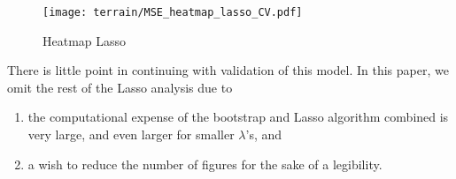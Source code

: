         \begin{figure}
            \texttt{[image: terrain/MSE\_heatmap\_lasso\_CV.pdf]}
            \caption{Heatmap Lasso}
            \label{fig:gc_gridsearch_lasso}
        \end{figure}

        There is little point in continuing with validation of this model. In this paper, we omit the rest of the Lasso analysis due to 

        \begin{enumerate}[label=(\roman*)]
            \item the computational expense of the bootstrap and Lasso algorithm combined is very large, and even larger for smaller $\lambda$'s, and
            \item a wish to reduce the number of figures for the sake of a legibility.
        \end{enumerate}

      





    